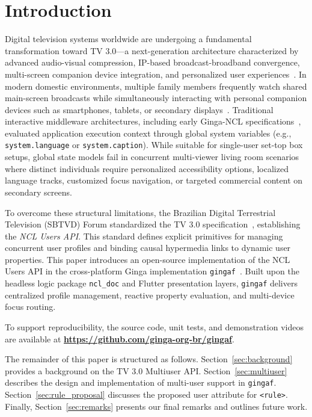 \documentclass[sigconf,authorversion,review,authordraft]{webmedia}
\begin{document}
\maketitle

\section{Introduction}
\label{sec:intro}
Digital television systems worldwide are undergoing a fundamental transformation toward TV 3.0—a next-generation architecture characterized by advanced audio-visual compression, IP-based broadcast-broadband convergence, multi-screen companion device integration, and personalized user experiences~\cite{santos2026overview}. In modern domestic environments, multiple family members frequently watch shared main-screen broadcasts while simultaneously interacting with personal companion devices such as smartphones, tablets, or secondary displays~\cite{souza2020ncl360}. Traditional interactive middleware architectures, including early Ginga-NCL specifications~\cite{soares2010ginga, ITU_H761}, evaluated application execution context through global system variables (e.g., \texttt{system.language} or \texttt{system.caption}). While suitable for single-user set-top box setups, global state models fail in concurrent multi-viewer living room scenarios where distinct individuals require personalized accessibility options, localized language tracks, customized focus navigation, or targeted commercial content on secondary screens.

To overcome these structural limitations, the Brazilian Digital Terrestrial Television (SBTVD) Forum standardized the TV 3.0 specification~\cite{abnt_15608_4}, establishing the \textit{NCL Users API}. This standard defines explicit primitives for managing concurrent user profiles and binding causal hypermedia links to dynamic user properties. This paper introduces an open-source implementation of the NCL Users API in the cross-platform Ginga implementation \texttt{gingaf}~\cite{gingaf2026}. Built upon the headless logic package \texttt{ncl\_doc} and Flutter presentation layers, \texttt{gingaf} delivers centralized profile management, reactive property evaluation, and multi-device focus routing.

To support reproducibility, the source code, unit tests, and demonstration videos are available at \textbf{\url{https://github.com/ginga-org-br/gingaf}}.

The remainder of this paper is structured as follows. Section~\ref{sec:background} provides a background on the TV 3.0 Multiuser API. Section~\ref{sec:multiuser} describes the design and implementation of multi-user support in \texttt{gingaf}. Section~\ref{sec:rule_proposal} discusses the proposed user attribute for \texttt{<rule>}. Finally, Section~\ref{sec:remarks} presents our final remarks and outlines future work.
\end{document}
